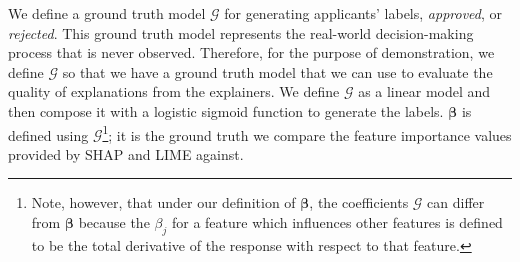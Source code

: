 \documentclass[mnsc,blindrev]{informs3}
\begin{document}

   We define a ground truth model $\mathcal{G}$ for generating applicants' labels, \textit{approved}, or \textit{rejected}. This ground truth model represents the real-world decision-making process that is never observed. Therefore, for the purpose of demonstration, we define $\mathcal{G}$ so that we have a ground truth model that we can use to evaluate the quality of explanations from the explainers. We define $\mathcal{G}$ as a linear model and then compose it with a logistic sigmoid function to generate the labels. $\boldsymbol{\beta}$ is defined using $\mathcal{G}$\footnote{Note, however, that under our definition of $\boldsymbol{\beta}$, the coefficients $\mathcal{G}$ can differ from $\boldsymbol{\beta}$ because the $\beta_j$ for a feature which influences other features is defined to be the total derivative of the response with respect to that feature.}; it is the ground truth we compare the feature importance values provided by SHAP and LIME against.
   
\end{document}
